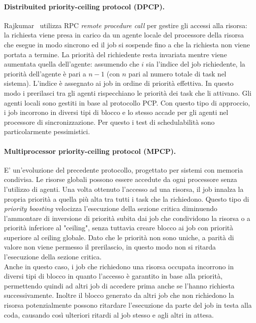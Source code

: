 \paragraph{Distribuited priority-ceiling protocol (DPCP).} Rajkumar~\cite{Rajkumar:1991:SRS:532621} utilizza RPC \textit{remote procedure call} per gestire gli accessi alla risorsa: la richiesta viene presa in carico da un agente locale del processore della risorsa che esegue in modo sincrono ed il job si sospende fino a che la richiesta non viene portata a termine. La priorità del richiedente resta invariata mentre viene aumentata quella dell'agente: assumendo che $i$ sia l'indice del job richiedente, la priorità dell'agente è pari a $n - 1$ (con $n$ pari al numero totale di task nel sistema). L'indice è assegnato ai job in ordine di priorità effettiva. In questo modo i prerilasci tra gli agenti rispecchiano le priorità dei task che li attivano. Gli agenti locali sono gestiti in base al protocollo PCP. Con questo tipo di approccio, i job incorrono in diversi tipi di blocco e lo stesso accade per gli agenti nel processore di sincronizzazione. Per questo i test di schedulabilità sono particolarmente pessimistici.\\

\paragraph{Multiprocessor priority-ceiling protocol (MPCP).} E' un'evoluzione del precedente protocollo, progettato per sistemi con memoria condivisa. Le risorse globali possono essere accedute da ogni processore senza l'utilizzo di agenti. Una volta ottenuto l'accesso ad una risorsa, il job innalza la propria priorità a quella più alta tra tutti i task che la richiedono. Questo tipo di \textit{priority boosting} velocizza l'esecuzione della sezione critica diminuendo l'ammontare di inversione di priorità subita dai job che condividono la risorsa o a priorità inferiore al "ceiling", senza tuttavia creare blocco ai job con priorità superiore al ceiling globale. Dato che le priorità non sono uniche, a parità di valore non viene permesso il prerilascio, in questo modo non si ritarda l'esecuzione della sezione critica.\\
Anche in questo caso, i job che richiedono una risorsa occupata incorrono in diversi tipi di blocco in quanto l'accesso è garantito in base alla priorità, permettendo quindi ad altri job di accedere prima anche se l'hanno richiesta successivamente. Inoltre il blocco generato da altri job che non richiedono la risorsa potenzialmente possono ritardare l'esecuzione da parte del job in testa alla coda, causando così ulteriori ritardi al job stesso e agli altri in attesa.\\

